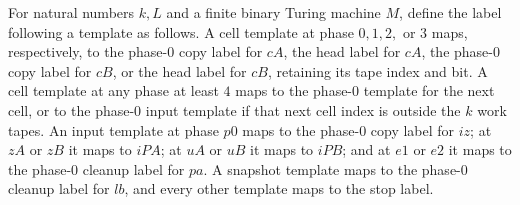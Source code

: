 \begin{definition}
\label{Complexity.UTab.Tpl.after}
\leanok
{}
For natural numbers $k,L$ and a finite binary Turing machine $M$, define the label
following a template as follows. A cell template at phase $0,1,2,$ or $3$ maps,
respectively, to the phase-$0$ copy label for $cA$, the head label for $cA$, the
phase-$0$ copy label for $cB$, or the head label for $cB$, retaining its tape index and
bit. A cell template at any phase at least $4$ maps to the phase-$0$ template for the
next cell, or to the phase-$0$ input template if that next cell index is outside the $k$
work tapes. An input template at phase $p0$ maps to the phase-$0$ copy label for $iz$;
at $zA$ or $zB$ it maps to $iPA$; at $uA$ or $uB$ it maps to $iPB$; and at $e1$ or $e2$
it maps to the phase-$0$ cleanup label for $pa$. A snapshot template maps to the
phase-$0$ cleanup label for $lb$, and every other template maps to the stop label.
\end{definition}

